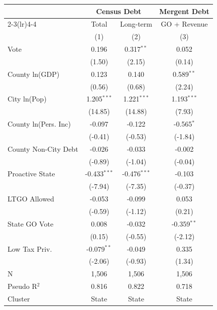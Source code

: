 \begingroup
\centering
\begin{tabular*}{\textwidth}{@{\extracolsep{\fill}}lccc}
   \toprule
                        & \multicolumn{2}{c}{Census Debt} & \multicolumn{1}{c}{Mergent Debt}\\  
   \cmidrule(lr){2-3}\cmidrule(lr){4-4}
                        & Total             & Long-term             & GO + Revenue \\   
                        & (1)               & (2)                   & (3)\\  
   \midrule 
   Vote                 & 0.196             & 0.317$^{**}$          & 0.052\\   
                        & (1.50)           & (2.15)               & (0.14)\\   
   County ln(GDP)       & 0.123             & 0.140                 & 0.589$^{**}$\\   
                        & (0.56)           & (0.68)               & (2.24)\\   
   City ln(Pop)         & 1.205$^{***}$     & 1.221$^{***}$         & 1.193$^{***}$\\   
                        & (14.85)          & (14.88)              & (7.93)\\   
   County ln(Pers. Inc) & -0.097            & -0.122                & -0.565$^{*}$\\   
                        & (-0.41)          & (-0.53)              & (-1.84)\\   
   County Non-City Debt & -0.026            & -0.033                & -0.002\\   
                        & (-0.89)          & (-1.04)              & (-0.04)\\   
   Proactive State      & -0.433$^{***}$    & -0.476$^{***}$        & -0.103\\   
                        & (-7.94)          & (-7.35)              & (-0.37)\\   
   LTGO Allowed         & -0.053            & -0.099                & 0.053\\   
                        & (-0.59)          & (-1.12)              & (0.21)\\   
   State GO Vote        & 0.008             & -0.032                & -0.359$^{**}$\\   
                        & (0.15)           & (-0.55)              & (-2.12)\\   
   Low Tax Priv.        & -0.079$^{**}$     & -0.049                & 0.335\\   
                        & (-2.06)          & (-0.93)              & (1.34)\\   
   \hline
   N         & 1,506             & 1,506                 & 1,506\\  
   Pseudo R$^2$         & 0.816             & 0.822                 & 0.718\\  
   Cluster              & State & State & State\\  
   \bottomrule
\end{tabular*}
\par\endgroup
